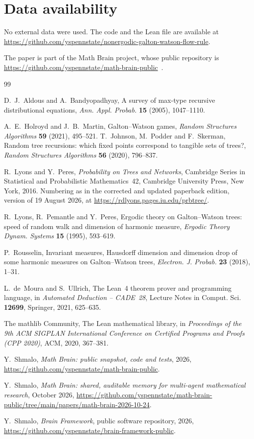 \documentclass[11pt]{amsart}
\theoremstyle{remark}
\numberwithin{equation}{section}
\begin{document}
\section*{Data availability}
No external data were used. The code and the Lean file are available at\\ \url{https://github.com/yspennstate/nonergodic-galton-watson-flow-rule}.

The paper is part of the Math Brain project, whose public repository is \url{https://github.com/yspennstate/math-brain-public}~\cite{MathBrainRepo}.

\begin{thebibliography}{99}

D.~J.~Aldous and A.~Bandyopadhyay, A survey of max-type recursive distributional equations, \emph{Ann. Appl. Probab.} \textbf{15} (2005), 1047--1110.

A.~E.~Holroyd and J.~B.~Martin, Galton--Watson games, \emph{Random Structures Algorithms} \textbf{59} (2021), 495--521.
T.~Johnson, M.~Podder and F.~Skerman, Random tree recursions: which fixed points correspond to tangible sets of trees?, \emph{Random Structures Algorithms} \textbf{56} (2020), 796--837.

R.~Lyons and Y.~Peres, \emph{Probability on Trees and Networks}, Cambridge Series in Statistical and Probabilistic Mathematics~42, Cambridge University Press, New York, 2016. Numbering as in the corrected and updated paperback edition, version of 19 August 2026, at \url{https://rdlyons.pages.iu.edu/prbtree/}.

R.~Lyons, R.~Pemantle and Y.~Peres, Ergodic theory on Galton--Watson trees: speed of random walk and dimension of harmonic measure, \emph{Ergodic Theory Dynam. Systems} \textbf{15} (1995), 593--619.

P.~Rousselin, Invariant measures, Hausdorff dimension and dimension drop of some harmonic measures on Galton--Watson trees, \emph{Electron. J. Probab.} \textbf{23} (2018), 1--31.

L.~de~Moura and S.~Ullrich, The Lean~4 theorem prover and programming language, in \emph{Automated Deduction -- CADE~28}, Lecture Notes in Comput. Sci. \textbf{12699}, Springer, 2021, 625--635.

The mathlib Community, The Lean mathematical library, in \emph{Proceedings of the 9th ACM SIGPLAN International Conference on Certified Programs and Proofs (CPP 2020)}, ACM, 2020, 367--381.

 Y.~Shmalo, \emph{Math Brain: public snapshot, code and tests}, 2026, \url{https://github.com/yspennstate/math-brain-public}.

 Y.~Shmalo, \emph{Math Brain: shared, auditable memory for multi-agent mathematical research}, October 2026, \url{https://github.com/yspennstate/math-brain-public/tree/main/papers/math-brain-2026-10-24}.

 Y.~Shmalo, \emph{Brain Framework}, public software repository, 2026, \url{https://github.com/yspennstate/brain-framework-public}.

\end{thebibliography}
\end{document}

